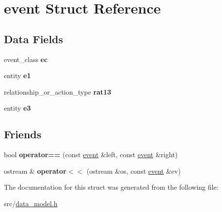 \hypertarget{structevent}{}\section{event Struct Reference}
\label{structevent}
\subsection*{Data Fields}
\begin{DoxyCompactItemize}
\item 
\mbox{\label{structevent_ac32b92ff80a203fd7c27e7313e4429d2}} 
event\+\_\+class {\bfseries ec}
\item 
\mbox{\label{structevent_a829a8f5791c5189324ffa115608f20ee}} 
entity {\bfseries e1}
\item 
\mbox{\label{structevent_a4bf1c0667655028954126c33657330c9}} 
relationship\+\_\+or\+\_\+action\+\_\+type {\bfseries rat13}
\item 
\mbox{\label{structevent_ac7c3b30ab1c81bece0be283c615a7015}} 
entity {\bfseries e3}
\end{DoxyCompactItemize}
\subsection*{Friends}
\begin{DoxyCompactItemize}
\item 
\mbox{\label{structevent_a3dd0c9c41d63a2d2171cffc7dfa14d6c}} 
bool {\bfseries operator==} (const \hyperlink{structevent}{event} \&left, const \hyperlink{structevent}{event} \&right)
\item 
\mbox{\label{structevent_a4d697ad127dbb87399c435f1e216ec8a}} 
ostream \& {\bfseries operator$<$$<$} (ostream \&os, const \hyperlink{structevent}{event} \&ev)
\end{DoxyCompactItemize}


The documentation for this struct was generated from the following file\+:\begin{DoxyCompactItemize}
\item 
src/\hyperlink{data__model_8h}{data\+\_\+model.\+h}\end{DoxyCompactItemize}
